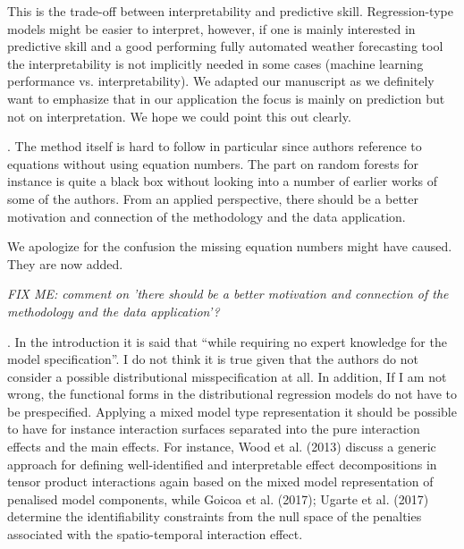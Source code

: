 \documentclass[american,foldmarks=false,noconfig]{uibklttr}
\newenvironment{review}{\fontshape{\itdefault}\fontseries{\bfdefault} \selectfont \smallskip}{\par}
\begin{document}
This is the trade-off between interpretability and predictive 
skill. Regression-type models might be easier to interpret, 
however, if one is mainly interested in predictive skill and
a good performing fully automated weather forecasting tool the 
interpretability is not implicitly needed in some cases 
(machine learning performance vs. interpretability).
We adapted our manuscript as we definitely want to emphasize that 
in our application the focus is mainly on prediction but not on 
interpretation. We hope we could point this out clearly.

\begin{review}
4. The method itself is hard to follow in particular since 
authors reference to equations without using equation numbers. 
The part on random forests for instance is quite a black box 
without looking into a number of earlier works of some of 
the authors. From an applied perspective, there should be a 
better motivation and connection of the methodology and the 
data application.
\end{review}

We apologize for the confusion the missing equation numbers 
might have caused. They are now added.

\textit{FIX ME: comment on 'there should be a 
better motivation and connection of the methodology and the 
data application'?}


\begin{review}
5. In the introduction it is said that ``while requiring no 
expert knowledge for the model specification''. I do not think 
it is true given that the authors do not consider a possible 
distributional misspecification at all. In addition, If I am 
not wrong, the functional forms in the distributional 
regression models do not have to be prespecified. Applying a 
mixed model type representation it should be possible to
have for instance interaction surfaces separated into the pure 
interaction effects and the main effects. For instance, 
Wood et al. (2013) discuss a generic approach for defining 
well-identified and interpretable effect decompositions in 
tensor product interactions again based on the mixed model 
representation of penalised model components, while Goicoa 
et al. (2017); Ugarte et al. (2017) determine the identifiability
constraints from the null space of the penalties associated 
with the spatio-temporal interaction effect.
\end{review}
\end{document}
